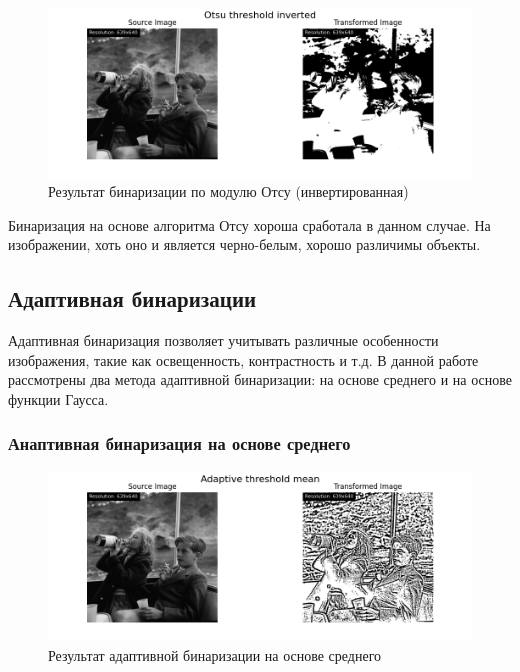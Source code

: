 \begin{figure}[ht!]
    \centering
    \includegraphics[width=\textwidth]{../results/Otsu threshold inverted.png}
    \caption{Результат бинаризации по модулю Отсу (инвертированная)}
    \label{img:otsu_threshold_inv}
\end{figure}

Бинаризация на основе алгоритма Отсу хороша сработала в данном случае. На изображении, хоть оно и является черно-белым, хорошо различимы объекты.

\FloatBarrier
\subsection{Адаптивная бинаризации}

Адаптивная бинаризация позволяет учитывать различные особенности изображения, такие как освещенность, контрастность и т.д. В данной работе рассмотрены два метода адаптивной бинаризации: на основе среднего и на основе функции Гаусса.

\subsubsection{Анаптивная бинаризация на основе среднего}

\begin{figure}[ht!]
    \centering
    \includegraphics[width=\textwidth]{../results/Adaptive threshold mean.png}
    \caption{Результат адаптивной бинаризации на основе среднего}
    \label{img:adaptive_mean}
\end{figure}

